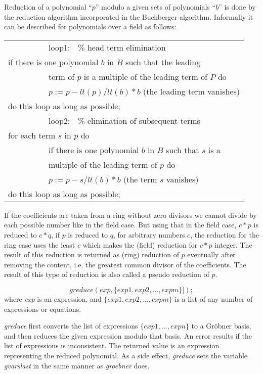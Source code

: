  \label{groebner:background}
Reduction of a polynomial ``$p$'' modulo a given sets of polynomials
``$b$'' is done by the reduction algorithm incorporated in the
Buchberger algorithm. Informally it can be described for
polynomials over a field as follows:
\begin{center}
\begin{tabular}{l}
~~~~~~~~~~loop1:~~\% head term elimination \\
if there is one polynomial $b$ in $B$ such that the leading \\
~~~~~~~~~~term of $p$ is a multiple of the leading term of $P$ do \\
~~~~~~~~~~$p := p - lt(p)/lt(b) * b$  (the leading term vanishes) \\
do this loop as long as possible; \\
~~~~~~~~~~loop2:~~\% elimination of subsequent terms \\
for each term $s$ in $p$ do \\
~~~~~~~~~~if there is one polynomial $b$ in $B$ such that $s$ is a \\
~~~~~~~~~~multiple of the leading term of $p$ do \\
~~~~~~~~~~$p := p - s/lt(b) * b$ (the term $s$ vanishes) \\
do this loop as long as possible;
\end{tabular}
\end{center}

If the coefficients are taken from a ring without zero divisors we
cannot divide by each possible number like in the field case. But
using that in the field case,  $c*p $ is reduced to  $c*q $, if $ p $
is reduced to $ q $, for arbitrary numbers $ c $,  the reduction for
the ring case uses the least $ c $ which makes the (field) reduction
for $ c*p $ integer. The result of this reduction is returned as
(ring) reduction of $ p $ eventually after removing the content, i.e.
the greatest common divisor of the coefficients. The result of this
type of reduction is also called a pseudo reduction of $ p $.

\[
\textit{greduce}(exp, \{exp1, exp2, \ldots , expm\}]);
\]
where {\it exp} is an expression, and $\{exp1, exp2,\ldots , expm\}$ is
a list of any number of expressions or equations.

\emph{greduce} first converts the list of expressions $\{exp1, \ldots ,
expn\}$ to a Gr\"obner basis, and then reduces the given expression
modulo that basis.  An error results if the list of expressions is
inconsistent. The returned value is an expression representing the
reduced polynomial. As a side effect, \emph{greduce} sets the variable {\it
gvarslast} in the same manner as \emph{groebner} does.

